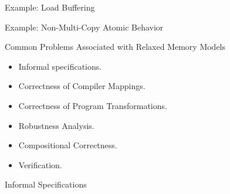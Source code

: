 \documentclass[notes, xcolor = dvipsnames]{beamer}
\begin{document}
    \begin{frame}{Example: Load Buffering}
        
    \end{frame}

    \begin{frame}{Example: Non-Multi-Copy Atomic Behavior}
        
    \end{frame}


    \begin{frame}{Common Problems Associated with Relaxed Memory Models}
        
        \begin{itemize}
            \item Informal specifications.
            \item Correctness of Compiler Mappings.
            \item Correctness of Program Transformations.
            \item Robustness Analysis.
            \item Compositional Correctness.
            \item Verification. 
        \end{itemize}
        

    \end{frame}

    \begin{frame}{Informal Specifications}
        
    \end{frame}
\end{document}
